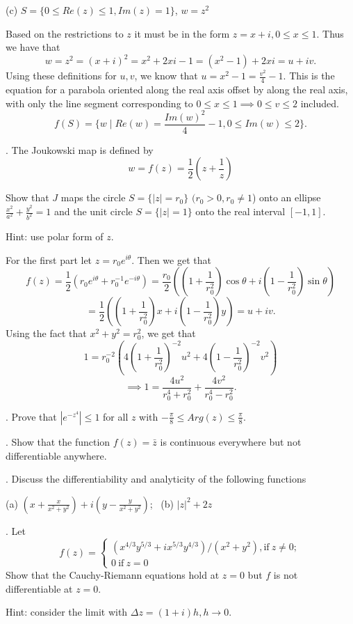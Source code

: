 \documentclass[letterpaper, reqno,11pt]{article}
\begin{document}
(c) $S= \{ 0\leq Re(z) \leq 1, Im (z)=1 \}$, $ w=z^2$

Based on the restrictions to $z$ it must be in the form $z=x+i, 0\leq x\leq 1$. Thus we have that 
\[
w=z^2=(x+i)^2=x^2+2xi-1=(x^2-1)+2xi=u+iv
.\]
Using these definitions for $u,v$, we know that $u=x^2-1=\frac{v^2}{4}-1$. This is the equation for a parabola oriented along the real axis offset by along the real axis, with only the line segment corresponding to $0\leq x\leq 1\implies 0\leq v\leq 2$ included. 
\[
f(S)=\{w\mid Re(w)=\frac{Im(w)^2}{4}-1, 0\leq Im(w)\leq 2\} 
.\]

\medskip

. The Joukowski map is defined by
$$ w=f(z)= \frac{1}{2} (z+\frac{1}{z} )$$


Show that $J$ maps the circle $ S=\{ |z|=r_0\}$ $(r_0>0, r_0\not =1$) onto an ellipse  $\frac{x^2}{a^2}+\frac{y^2}{b^2}=1$ and the unit circle $ S=\{ |z|=1\}$ onto the real interval $ [-1,1]$.

Hint: use polar form of $z$.

\medskip

For the first part let $z=r_0e^{i\theta}$. Then we get that 
\[
f(z)=\frac{1}{2}\left( r_0e^{i\theta}+r_0^{-1}e^{-i\theta} \right) =\frac{r_0}{2}\left( (1+\frac{1}{r_0^2})\cos\theta+i(1-\frac{1}{r_0^2})\sin\theta \right)
\]
\[
 =\frac{1}{2}\left( (1+\frac{1}{r_0^2})x+i(1-\frac{1}{r_0^2})y\right)=u+iv
.\]
Using the fact that $x^2+y^2=r_0^2$, we get that 
\[
1=r_0^{-2}\left( 4\left( 1+\frac{1}{r_0^2} \right)^{-2}u^2+4\left( 1-\frac{1}{r_0^2} \right)^{-2}v^2  \right)
\]
\[
\implies 1=\frac{4u^2}{r_0^{4}+r_0^2}+\frac{4v^2}{r_0^{4}-r_0^2}
.\]



\medskip

. Prove that $ |e^{-z^4}|\leq 1$ for all $z$ with $ -\frac{\pi}{8} \leq Arg (z) \leq \frac{\pi}{8}$.

\medskip

. Show that the function $ f(z)= \bar{z}$ is continuous everywhere but not differentiable anywhere.

\medskip

. Discuss the differentiability and analyticity of the following functions

(a) $(x+\frac{x}{x^2+y^2})+ i (y-\frac{y}{x^2+y^2})$; \ (b) $ |z|^2+ 2z$


. Let
$$ f(z) = \left\{\begin{array}{l}
 ( x^{4/3} y^{5/3} + i x^{5/3} y^{4/3})/(x^2+y^2),  \mbox{if} \ z \not =0 ;\\
 0 \ \mbox{if} \ z=0
 \end{array}
 \right.
 $$
 Show that the Cauchy-Riemann equations hold at $z=0$ but $ f$ is not differentiable at $z=0$.

Hint: consider the limit with $\Delta z= (1+i) h, h \to 0$.
\end{document}
